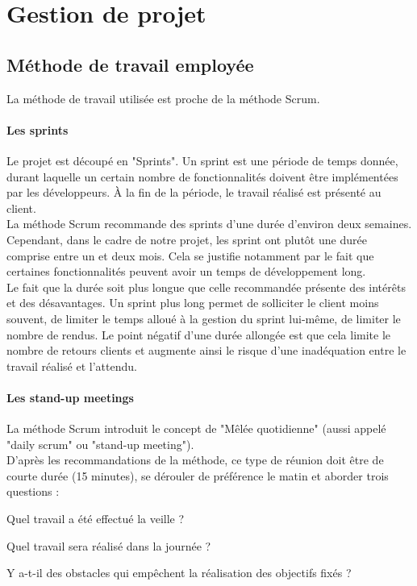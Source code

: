 \newpage


\section{Gestion de projet}
\label{sec:projectManagement}

\subsection{Méthode de travail employée}
La méthode de travail utilisée est proche de la méthode Scrum.
\paragraph*{Les sprints\\}
Le projet est découpé en "Sprints". Un sprint est une période de temps donnée, durant laquelle un certain nombre de fonctionnalités doivent être implémentées par les développeurs. À la fin de la période, le travail réalisé est présenté au client.\\

La méthode Scrum recommande des sprints d'une durée d'environ deux semaines. Cependant, dans le cadre de notre projet, les sprint ont plutôt une durée comprise entre un et deux mois. Cela se justifie notamment par le fait que certaines fonctionnalités peuvent avoir un temps de développement long.\\
Le fait que la durée soit plus longue que celle recommandée présente des intérêts et des désavantages. 
Un sprint plus long permet de solliciter le client moins souvent, de limiter le temps alloué à la gestion du sprint lui-même, de limiter le nombre de rendus.
Le point négatif d'une durée allongée est que cela limite le nombre de retours clients et augmente ainsi le risque d'une inadéquation entre le travail réalisé et l'attendu.

\paragraph*{Les stand-up meetings\\}
La méthode Scrum introduit le concept de "Mêlée quotidienne" (aussi appelé "daily scrum" ou "stand-up meeting")\cite{bib:dailyScrum}.\\
D'après les recommandations de la méthode, ce type de réunion doit être de courte durée (15 minutes), se dérouler de préférence le matin et aborder trois questions :
\begin{sitemize}
	\item Quel travail a été effectué la veille ?
	\item Quel travail sera réalisé dans la journée ?
	\item Y a-t-il des obstacles qui empêchent la réalisation des objectifs fixés ?
\end{sitemize}

